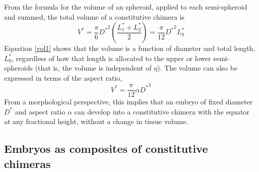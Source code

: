 \documentclass[10pt,a4paper]{article}
\begin{document}
From the formula for the volume of an spheroid, applied to each semi-spheroid and summed, the total volume of a constitutive chimera is
\begin{equation}\label{vol1}
	V^* = \frac{\pi}{6} {D^*}^2 \left(\frac{L_1^*+L_2^*}{2}\right) = \frac{\pi}{12} {D^*}^2 L_0^*
\end{equation} 
Equation \ref{vol1} shows that the volume is a function of diameter and total length, $L_0^*$, regardless of how that length is allocated to the upper or lower semi-spheroids (that is, the volume is independent of $\eta$).
The volume can also be expressed in terms of the aspect ratio,
\begin{equation}\label{vol2}
	V^* = \frac{\pi}{12} \alpha {D^*}^3
\end{equation} 
From a morphological perspective, this implies that an embryo of fixed diameter $D^*$ and aspect ratio $\alpha$ can develop into a constitutive chimera with the equator at any fractional height, without a change in tissue volume. 

\subsection{Embryos as composites of constitutive chimeras}
\end{document}
